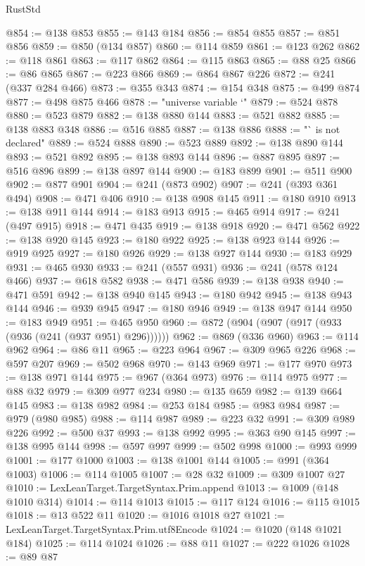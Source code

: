 \begin{lexlean}{RustStd}
\begin{coremodule}
@854 := @138 @853
@855 := @143 @184
@856 := @854 @855
@857 := @851 @856
@859 := @850 (@134 @857)
@860 := @114 @859
@861 := @123 @262
@862 := @118 @861
@863 := @117 @862
@864 := @115 @863
@865 := @88 @25
@866 := @86 @865
@867 := @223 @866
@869 := @864 @867 @226
@872 := @241 (@337 @284 @466)
@873 := @355 @343
@874 := @154 @348
@875 := @499 @874
@877 := @498 @875 @466
@878 := "universe variable `"
@879 := @524 @878
@880 := @523 @879
@882 := @138 @880 @144
@883 := @521 @882
@885 := @138 @883 @348
@886 := @516 @885
@887 := @138 @886
@888 := "` is not declared"
@889 := @524 @888
@890 := @523 @889
@892 := @138 @890 @144
@893 := @521 @892
@895 := @138 @893 @144
@896 := @887 @895
@897 := @516 @896
@899 := @138 @897 @144
@900 := @183 @899
@901 := @511 @900
@902 := @877 @901
@904 := @241 (@873 @902)
@907 := @241 (@393 @361 @494)
@908 := @471 @406
@910 := @138 @908 @145
@911 := @180 @910
@913 := @138 @911 @144
@914 := @183 @913
@915 := @465 @914
@917 := @241 (@497 @915)
@918 := @471 @435
@919 := @138 @918
@920 := @471 @562
@922 := @138 @920 @145
@923 := @180 @922
@925 := @138 @923 @144
@926 := @919 @925
@927 := @180 @926
@929 := @138 @927 @144
@930 := @183 @929
@931 := @465 @930
@933 := @241 (@557 @931)
@936 := @241 (@578 @124 @466)
@937 := @618 @582
@938 := @471 @586
@939 := @138 @938
@940 := @471 @591
@942 := @138 @940 @145
@943 := @180 @942
@945 := @138 @943 @144
@946 := @939 @945
@947 := @180 @946
@949 := @138 @947 @144
@950 := @183 @949
@951 := @465 @950
@960 := @872 (@904 (@907 (@917 (@933 (@936 (@241 (@937 @951) @296))))))
@962 := @869 (@336 @960)
@963 := @114 @962
@964 := @86 @11
@965 := @223 @964
@967 := @309 @965 @226
@968 := @597 @207
@969 := @502 @968
@970 := @143 @969
@971 := @177 @970
@973 := @138 @971 @144
@975 := @967 (@364 @973)
@976 := @114 @975
@977 := @88 @32
@979 := @309 @977 @234
@980 := @135 @659
@982 := @139 @664 @145
@983 := @138 @982
@984 := @253 @184
@985 := @983 @984
@987 := @979 (@980 @985)
@988 := @114 @987
@989 := @223 @32
@991 := @309 @989 @226
@992 := @500 @37
@993 := @138 @992
@995 := @363 @90 @145
@997 := @138 @995 @144
@998 := @597 @997
@999 := @502 @998
@1000 := @993 @999
@1001 := @177 @1000
@1003 := @138 @1001 @144
@1005 := @991 (@364 @1003)
@1006 := @114 @1005
@1007 := @28 @32
@1009 := @309 @1007 @27
@1010 := LexLeanTarget.TargetSyntax.Prim.append
@1013 := @1009 (@148 @1010 @314)
@1014 := @114 @1013
@1015 := @117 @124
@1016 := @115 @1015
@1018 := @13 @522 @11
@1020 := @1016 @1018 @27
@1021 := LexLeanTarget.TargetSyntax.Prim.utf8Encode
@1024 := @1020 (@148 @1021 @184)
@1025 := @114 @1024
@1026 := @88 @11
@1027 := @222 @1026
@1028 := @89 @87

\end{coremodule}
\end{lexlean}
